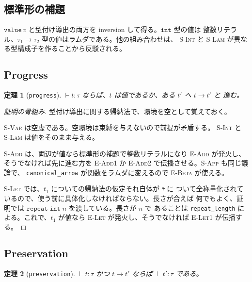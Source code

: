 \documentclass[11pt,a4paper]{ltjsarticle}
\newtheorem{theorem}{定理}
\newcommand{\tint}{\mathtt{int}}
\newcommand{\step}{\longrightarrow}
\begin{document}
\subsection{標準形の補題}

$\mathtt{value}\,v$ と型付け導出の両方を inversion して得る。$\tint$ 型の値は
整数リテラル、$\tau_1 \to \tau_2$ 型の値はラムダである。他の組み合わせは、
\textsc{S-Int} と \textsc{S-Lam} が異なる型構成子を作ることから反駁される。

\subsection{Progress}

\begin{theorem}[\texttt{progress}]
  $\vdash t : \tau$ ならば、$t$ は値であるか、ある $t'$ へ $t \step t'$ と
  進む。
\end{theorem}

\begin{proof}[証明の骨組み]
型付け導出に関する帰納法で、環境を空として覚えておく。

\textsc{S-Var} は空虚である。空環境は束縛を与えないので前提が矛盾する。
\textsc{S-Int} と \textsc{S-Lam} は値をそのまま与える。

\textsc{S-Add} は、両辺が値なら標準形の補題で整数リテラルになり
\textsc{E-Add} が発火し、そうでなければ先に進む方を \textsc{E-Add1} か
\textsc{E-Add2} で伝播させる。\textsc{S-App} も同じ議論で、
\texttt{canonical\_arrow} が関数をラムダに変えるので \textsc{E-Beta} が使える。

\textsc{S-Let} では、$t_1$ についての帰納法の仮定それ自体が $\bar\tau$ に
ついて全称量化されているので、使う前に具体化しなければならない。長さが合えば
何でもよく、証明では $\mathtt{repeat}\;\tint\;n$ を渡している。長さが $n$ で
あることは \texttt{repeat\_length} による。これで、$t_1$ が値なら
\textsc{E-Let} が発火し、そうでなければ \textsc{E-Let1} が伝播する。
\end{proof}

\subsection{Preservation}

\begin{theorem}[\texttt{preservation}]
  $\vdash t : \tau$ かつ $t \step t'$ ならば $\vdash t' : \tau$ である。
\end{theorem}
\end{document}
